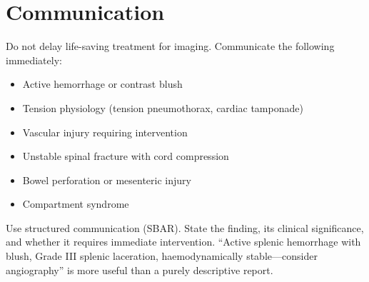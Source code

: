 \section{Communication}
Do not delay life-saving treatment for imaging. Communicate the following immediately:
\begin{itemize}
  \item Active hemorrhage or contrast blush
  \item Tension physiology (tension pneumothorax, cardiac tamponade)
  \item Vascular injury requiring intervention
  \item Unstable spinal fracture with cord compression
  \item Bowel perforation or mesenteric injury
  \item Compartment syndrome
\end{itemize}

\begin{pearlbox}
Use structured communication (SBAR). State the finding, its clinical significance, and whether it requires immediate intervention. ``Active splenic hemorrhage with blush, Grade III splenic laceration, haemodynamically stable---consider angiography'' is more useful than a purely descriptive report.
\end{pearlbox}

\clearpage
